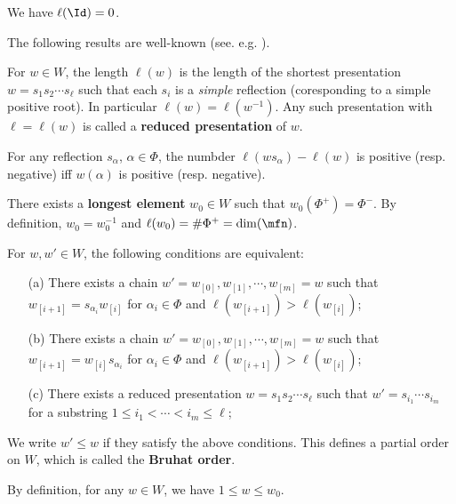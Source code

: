 	\begin{exam}
		We have $\ell(\Id)=0$.
	\end{exam}

	The following results are well-known (see. e.g. \cite[Sect. 0.3-0.4]{H}).
	\begin{propdefn}
		For $w\in W$, the length $\ell(w)$ is the length of the shortest presentation $w=s_{1}s_{2}\cdots s_{\ell}$ such that each $s_i$ is a \emph{simple} reflection (coresponding to a simple positive root). In particular $\ell(w) = \ell(w^{-1})$. Any such presentation with $\ell=\ell(w)$ is called a \textbf{reduced presentation} of $w$.
	\end{propdefn}

	\begin{lem}
		For any reflection $s_\alpha$, $\alpha\in \Phi$, the numbder $\ell(ws_\alpha) - \ell(w)$ is positive (resp. negative) iff $w(\alpha)$ is positive (resp. negative).
	\end{lem}

	\begin{lem}
		There exists a \textbf{longest element} $w_0\in W$ such that $w_0(\Phi^+) = \Phi^-$. By definition, $w_0 =w_0^{-1}$ and $\ell(w_0) = \# \Phi^+ =\dim(\mfn) $.
	\end{lem}

	\begin{propdefn}
		For $w,w'\in W$, the following conditions are equivalent:
		\begin{itemize}
			\item[(a)]
				There exists a chain $w'=w_{[0]}, w_{[1]},\cdots,w_{[m]}=w$ such that $w_{[i+1]} = s_{\alpha_i} w_{[i]}$ for $\alpha_i\in \Phi$ and $\ell(w_{[i+1]}) > \ell(w_{[i]})$;
			\item[(b)]
				There exists a chain $w'=w_{[0]}, w_{[1]},\cdots,w_{[m]}=w$ such that $w_{[i+1]} = w_{[i]}s_{\alpha_i} $ for $\alpha_i\in \Phi$ and $\ell(w_{[i+1]}) > \ell(w_{[i]})$;
			\item[(c)]
				There exists a reduced presentation $w=s_1s_2\cdots s_\ell$ such that $w'=s_{i_1}\cdots s_{i_m}$ for a substring $1\le i_1<\cdots<i_m\le \ell$;
		\end{itemize}
		We write $w' \le w$ if they satisfy the above conditions. This defines a partial order on $W$, which is called the \textbf{Bruhat order}. 
	\end{propdefn}

	\begin{rem}
		By definition, for any $w\in W$, we have $1\le w\le w_0$.
	\end{rem}

